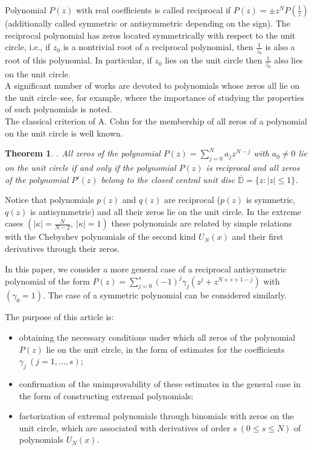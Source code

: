 \documentclass[12pt]{article}
\newtheorem{thm}{Theorem}[section]
\newcommand{\abs}[1]{\left|#1\right|}
\newcommand{\pa}[1]{\left(#1\right)}
\begin{document}
Polynomial $P(z)$ with real coefficients is called reciprocal if $P(z) = \pm z^NP(\frac{1}{z})$ (additionally called symmetric or antisymmetric depending on the sign). The reciprocal polynomial has zeros located symmetrically with respect to the unit circle, i.e., if $z_0$ is a nontrivial root of a reciprocal polynomial, then $\frac{1}{z_0}$ is also a root of this polynomial. In particular, if $z_0$ lies on the unit circle then $\frac{1}{z_0}$ also lies on the unit circle.
\\

A significant number of works are devoted to polynomials whose zeros all lie on the unit circle--see, for example, \cite{ref3,ref4,ref5,ref6,ref7} where the importance of studying the properties of such polynomials is noted.
\\

The classical criterion of A. Cohn for the membership of all zeros of a polynomial on the unit circle is well known.

\begin{thm}\label{thm1}\cite{ref2}. All zeros of the polynomial $\displaystyle P(z) = \sum_{j = 0}^{N}a_j z^{N - j}$ with $a_0 \neq 0$ lie on the unit circle if and only if the polynomial $P(z)$ is reciprocal and all zeros of the polynomial $P'(z)$ belong to the closed central unit disc $\overline{\mathbb D} = \{z: \abs{z} \leq 1\}$.
\end{thm}

Notice that polynomials $p(z)$ and $q(z)$ are reciprocal ($p(z)$ is symmetric, $q(z)$ is antisymmetric) and all their zeros lie on the unit circle. In the extreme cases $\pa{\abs{\kappa} = \frac{N}{N - 2}, \ \abs{\kappa} = 1}$ these polynomials are related by simple relations with the Chebyshev polynomials of the second kind $U_N(x)$ and their first derivatives through their zeros\cite{ref1}.

In this paper, we consider a more general case of a reciprocal antisymmetric polynomial of the form $\displaystyle P(z) = \sum_{j = 0}^{s}(-1)^j\gamma_j\pa{z^j + z^{N + s + 1 - j}}$ with $(\gamma_0 = 1)$. The case of a symmetric polynomial can be considered similarly.

The purpose of this article is:
\begin{itemize}
\item obtaining the necessary conditions under which all zeros of the polynomial $P(z)$ lie on the unit circle, in the form of estimates for the coefficients $\gamma_j \ (j = 1,\ldots, s)$;
\item confirmation of the unimprovability of these estimates in the general case in the form of constructing extremal polynomials;
\item factorization of extremal polynomials through binomials with zeros on the unit circle, which are associated with derivatives of order $s \ (0 \leq s \leq N)$ of polynomials $U_N(x)$.
\end{itemize}
\end{document}
